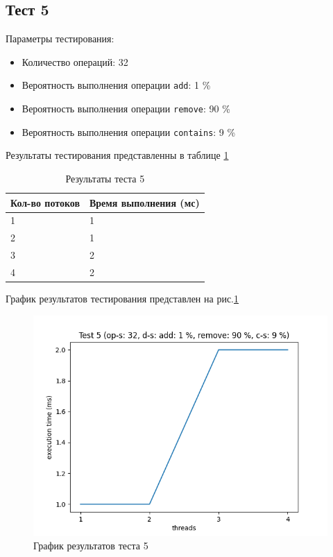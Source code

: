 \subsection*{Тест 5}

Параметры тестирования:

\begin{itemize}
    \item Количество операций: 32
    \item Вероятность выполнения операции \verb|add|: 1 \%
    \item Вероятность выполнения операции \verb|remove|: 90 \%
    \item Вероятность выполнения операции \verb|contains|: 9 \%
\end{itemize}

Результаты тестирования представленны в таблице \ref{tab:results5}


\begin{table}[H]
    \centering
    \begin{tabular}{|l|l|}
        \hline
        Кол-во потоков & Время выполнения (мс) \\
        \hline
        1 & 1 \\
        \hline
        2 & 1 \\
        \hline
        3 & 2 \\
        \hline
        4 & 2 \\
        \hline
    \end{tabular}
    \caption{Результаты теста 5}
    \label{tab:results5}
\end{table}
        

График результатов тестирования представлен на рис.\ref{fig:plot5}

\begin{figure}[H]
    \centering
    \includegraphics[width=0.7\linewidth]{photo/plot5}
    \caption{График результатов теста 5}
    \label{fig:plot5}
\end{figure}

